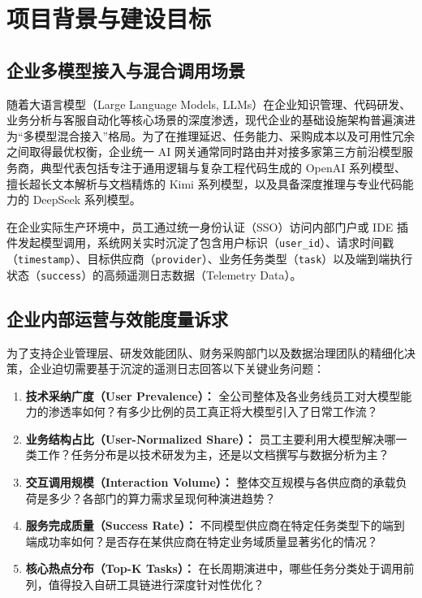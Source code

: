 \section{项目背景与建设目标}
\label{sec:background}

\subsection{企业多模型接入与混合调用场景}
随着大语言模型（Large Language Models, LLMs）在企业知识管理、代码研发、业务分析与客服自动化等核心场景的深度渗透，现代企业的基础设施架构普遍演进为“多模型混合接入”格局。为了在推理延迟、任务能力、采购成本以及可用性冗余之间取得最优权衡，企业统一 AI 网关通常同时路由并对接多家第三方前沿模型服务商，典型代表包括专注于通用逻辑与复杂工程代码生成的 OpenAI 系列模型、擅长超长文本解析与文档精炼的 Kimi 系列模型，以及具备深度推理与专业代码能力的 DeepSeek 系列模型。

在企业实际生产环境中，员工通过统一身份认证（SSO）访问内部门户或 IDE 插件发起模型调用，系统网关实时沉淀了包含用户标识（\texttt{user\_id}）、请求时间戳（\texttt{timestamp}）、目标供应商（\texttt{provider}）、业务任务类型（\texttt{task}）以及端到端执行状态（\texttt{success}）的高频遥测日志数据（Telemetry Data）。

\subsection{企业内部运营与效能度量诉求}
为了支持企业管理层、研发效能团队、财务采购部门以及数据治理团队的精细化决策，企业迫切需要基于沉淀的遥测日志回答以下关键业务问题：
\begin{enumerate}[label=(\arabic*), leftmargin=2em]
  \item \textbf{技术采纳广度（User Prevalence）：} 全公司整体及各业务线员工对大模型能力的渗透率如何？有多少比例的员工真正将大模型引入了日常工作流？
  \item \textbf{业务结构占比（User-Normalized Share）：} 员工主要利用大模型解决哪一类工作？任务分布是以技术研发为主，还是以文档撰写与数据分析为主？
  \item \textbf{交互调用规模（Interaction Volume）：} 整体交互规模与各供应商的承载负荷是多少？各部门的算力需求呈现何种演进趋势？
  \item \textbf{服务完成质量（Success Rate）：} 不同模型供应商在特定任务类型下的端到端成功率如何？是否存在某供应商在特定业务域质量显著劣化的情况？
  \item \textbf{核心热点分布（Top-K Tasks）：} 在长周期演进中，哪些任务分类处于调用前列，值得投入自研工具链进行深度针对性优化？
\end{enumerate}

